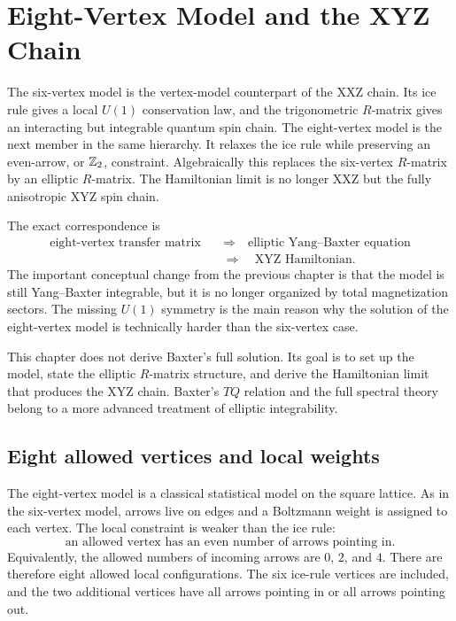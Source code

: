 \chapter{Eight-Vertex Model and the XYZ Chain}
\label{chap:eight-vertex-xyz}

The six-vertex model is the vertex-model counterpart of the XXZ chain.  Its ice
rule gives a local $U(1)$ conservation law, and the trigonometric $R$-matrix gives
an interacting but integrable quantum spin chain.  The eight-vertex model is the
next member in the same hierarchy.  It relaxes the ice rule while preserving an
even-arrow, or $\mathbb{Z}_2$, constraint.  Algebraically this replaces the six-vertex
$R$-matrix by an elliptic $R$-matrix.  The Hamiltonian limit is no longer XXZ but
the fully anisotropic XYZ spin chain.

The exact correspondence is
\[
\begin{aligned}
    \text{eight-vertex transfer matrix}
    &\quad\Longrightarrow\quad
    \text{elliptic Yang--Baxter equation}\\
    &\quad\Longrightarrow\quad
    \text{XYZ Hamiltonian}.
\end{aligned}
\]
The important conceptual change from the previous chapter is that the model is
still Yang--Baxter integrable, but it is no longer organized by total
magnetization sectors.  The missing $U(1)$ symmetry is the main reason why the
solution of the eight-vertex model is technically harder than the six-vertex
case.

This chapter does not derive Baxter's full solution.  Its goal is to set up the
model, state the elliptic $R$-matrix structure, and derive the Hamiltonian limit
that produces the XYZ chain.  Baxter's $TQ$ relation and the full spectral theory
belong to a more advanced treatment of elliptic integrability.

\section{Eight allowed vertices and local weights}
\label{sec:eight-vertex-local-weights}

The eight-vertex model is a classical statistical model on the square lattice.
As in the six-vertex model, arrows live on edges and a Boltzmann weight is
assigned to each vertex.  The local constraint is weaker than the ice rule:
\begin{equation}
\label{eq:eight-vertex-even-arrow-rule}
    \text{an allowed vertex has an even number of arrows pointing in.}
\end{equation}
Equivalently, the allowed numbers of incoming arrows are $0$, $2$, and $4$.
There are therefore eight allowed local configurations.  The six ice-rule
vertices are included, and the two additional vertices have all arrows pointing
in or all arrows pointing out.

